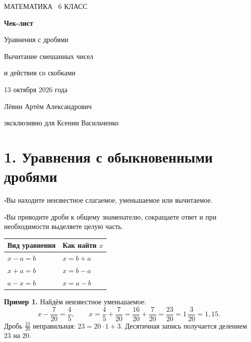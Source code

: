 \documentclass[a4paper,12pt]{article}
\newcommand{\sectionline}[1]{\section*{\color{darkaccent}#1}}
\newcommand{\learn}[1]{\par\noindent$\square$\enspace #1\par}
\begin{document}
\begin{titlepage}
\thispagestyle{empty}
\centering
\vspace*{32mm}
{\color{accent}\large МАТЕМАТИКА \textbullet\ 6 КЛАСС\par}
\vspace{18mm}
{\color{darkaccent}\Huge\bfseries Чек-лист\par}
\vspace{8mm}
{\LARGE Уравнения с дробями\par}
\vspace{3mm}
{\Large Вычитание смешанных чисел\par}
\vspace{3mm}
{\Large и действия со скобками\par}
\vspace{20mm}
{\large 13 октября 2026 года\par}
\vfill
{\large Лёвин Артём Александрович\par}
\vspace{2mm}
{\normalsize эксклюзивно для Ксении Васильченко\par}
\vspace{33mm}
\end{titlepage}

\sectionline{1. Уравнения с обыкновенными дробями}
\learn{Вы находите неизвестное слагаемое, уменьшаемое или вычитаемое.}
\learn{Вы приводите дроби к общему знаменателю, сокращаете ответ и при необходимости выделяете целую часть.}

\begin{center}
\begin{tabular}{@{}ll@{}}
\toprule
\textbf{Вид уравнения} & \textbf{Как найти $x$}\\
\midrule
$x-a=b$ & $x=b+a$\\
$x+a=b$ & $x=b-a$\\
$a-x=b$ & $x=a-b$\\
\bottomrule
\end{tabular}
\end{center}

\textbf{Пример 1.} Найдём неизвестное уменьшаемое:
\[
 x-\frac7{20}=\frac45,\qquad
 x=\frac45+\frac7{20}=\frac{16}{20}+\frac7{20}
  =\frac{23}{20}=1\,\frac3{20}=1{,}15.
\]
Дробь $\frac{23}{20}$ неправильная: $23=20\cdot1+3$.
Десятичная запись получается делением $23$ на $20$.
\end{document}
